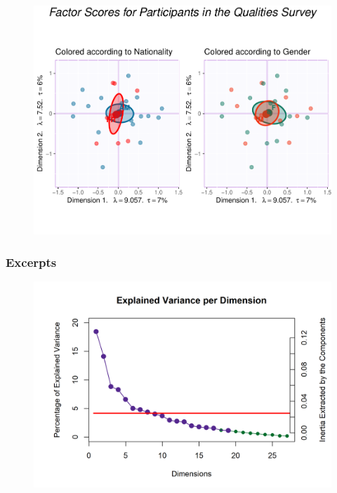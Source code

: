 \documentclass[
  english,
  man,floatsintext]{apa6}
\begin{document}
\begin{figure}

{\centering \includegraphics[width=0.75\linewidth]{Music-Descriptor-Space_files/figure-latex/judgesplotQ-1} 

}

\caption{ }\label{fig:judgesplotQ}
\end{figure}

\hypertarget{excerpts}{%
\subsubsection{Excerpts}\label{excerpts}}

\begin{figure}  
  \begin{center}
    \includegraphics{./Music-Descriptor-Space_files/figure-latex/scree4excerptsq-1.png}
  \caption{ }\label{fig:scree4excerptsq}  
 \end{center}
\end{figure}
\end{document}

